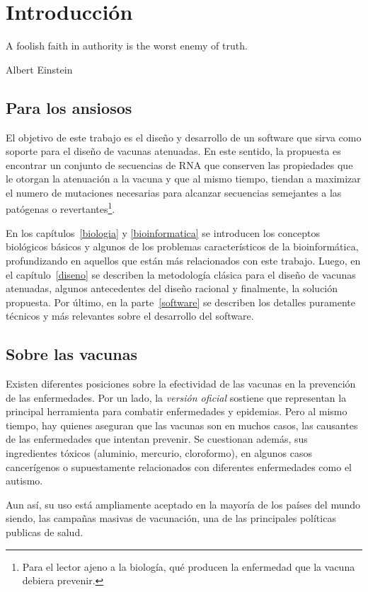 \chapter{Introducci\'on}
\epigraph{A foolish faith in authority is the worst enemy of truth.}%
         {Albert Einstein}

\section{Para los ansiosos}
El objetivo de este trabajo es el dise\~no y desarrollo de un software que
sirva como soporte para el dise\~no de vacunas atenuadas. En este sentido, la
propuesta es encontrar un conjunto de secuencias de \ac{RNA} que conserven las
propiedades que le otorgan la atenuaci\'on a la vacuna y que al mismo tiempo,
tiendan a maximizar el numero de mutaciones necesarias para alcanzar secuencias
semejantes a las pat\'ogenas o revertantes\footnote{Para el lector ajeno a la
biolog\'ia, qu\'e producen la enfermedad que la vacuna debiera prevenir.}. 

En los cap\'itulos~\ref{biologia} y \ref{bioinformatica} se introducen los
conceptos biol\'ogicos b\'asicos y algunos de los problemas caracter\'isticos
de la bioinform\'atica, profundizando en aquellos que est\'an m\'as relacionados
con este trabajo. Luego, en el cap\'itulo~\ref{diseno} se describen la
metodolog\'ia cl\'asica para el dise\~no de vacunas atenuadas, algunos
antecedentes del dise\~no racional y finalmente, la soluci\'on propuesta. Por
\'ultimo, en la parte~\ref{software} se describen los detalles puramente
t\'ecnicos y m\'as relevantes sobre el desarrollo del software.

\section{Sobre las vacunas}
\label{vacunas}
Existen diferentes posiciones sobre la efectividad de las vacunas en la
prevenci\'on de las enfermedades. Por un lado, la \textit{versi\'on oficial}
sostiene que representan la principal herramienta para combatir enfermedades y
epidemias. Pero al mismo tiempo, hay quienes aseguran que las vacunas son en
muchos casos, las causantes de las enfermedades que intentan prevenir. Se
cuestionan adem\'as, sus ingredientes t\'oxicos (aluminio, mercurio,
cloroformo), en algunos casos cancer\'igenos o supuestamente relacionados con
diferentes enfermedades como el autismo.

Aun as\'i, su uso est\'a ampliamente aceptado en la mayor\'ia de los pa\'ises
del mundo siendo, las campa\~nas masivas de vacunaci\'on, una de las principales
pol\'iticas publicas de salud. 

